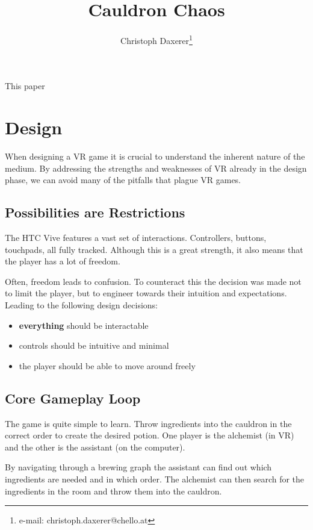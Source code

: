 \documentclass{vgtc}
\title{Cauldron Chaos}
\author{Christoph Daxerer\thanks{e-mail: christoph.daxerer@chello.at}}
\affiliation{\scriptsize Software Engineering ba. VZ FH-Oberösterreich Hagenberg}
\begin{document}

\maketitle

This paper 

\section{Design}

When designing a VR game it is crucial to understand the inherent nature of the medium. 
By addressing the strengths and weaknesses of VR already in the design phase, we can
avoid many of the pitfalls that plague VR games.

\subsection{Possibilities are Restrictions}

The HTC Vive features a vast set of interactions. Controllers, buttons, touchpads, all fully tracked. 
Although this is a great strength, it also means that the player has a lot of freedom. 

Often, freedom leads to confusion. To counteract this the decision was made not to limit the player,
but to engineer towards their intuition and expectations. Leading to the following design decisions:

\begin{itemize}
  \item \textbf{everything} should be interactable
  \item controls should be intuitive and minimal
  \item the player should be able to move around freely
\end{itemize}

\subsection{Core Gameplay Loop}

The game is quite simple to learn. Throw ingredients into the cauldron in the correct order to create the 
desired potion. One player is the alchemist (in VR) and the other is the assistant (on the computer).

By navigating through a brewing graph the assistant can find out which ingredients are needed and 
in which order. The alchemist can then search for the ingredients in the room and throw them into the
cauldron.
\end{document}
